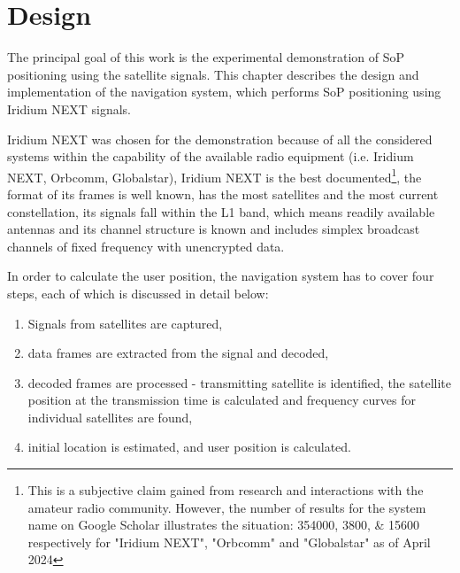 \chapter{Design}
\newcommand{\param}[1]{\texttt{\MakeUppercase{#1}}}
\newcommand{\variation}[1]{\paragraph{#1}}
\newcommand{\file}[1]{\paragraph{\texttt{#1}}}

The principal goal of this work is the experimental demonstration of SoP positioning using the satellite signals. This chapter describes the design and implementation of the navigation system, which performs SoP positioning using Iridium NEXT signals.

Iridium NEXT was chosen for the demonstration because of all the considered systems within the capability of the available radio equipment (i.e. Iridium NEXT, Orbcomm, Globalstar), Iridium NEXT is the best documented\footnote{This is a subjective claim gained from research and interactions with the amateur radio community. However, the number of results for the system name on Google Scholar illustrates the situation: \numlist{354000; 3800; 15600} respectively for "Iridium NEXT", "Orbcomm" and "Globalstar" as of April 2024}, the format of its frames is well known, has the most satellites and the most current constellation, its signals fall within the L1 band, which means readily available antennas and its channel structure is known and includes simplex broadcast channels of fixed frequency with unencrypted data.

In order to calculate the user position, the navigation system has to cover four steps, each of which is discussed in detail below:
\begin{enumerate}
    \item Signals from satellites are captured,
    \item data frames are extracted from the signal and decoded,
    \item decoded frames are processed - transmitting satellite is identified, the satellite position at the transmission time is calculated and frequency curves for individual satellites are found,
    \item initial location is estimated, and user position is calculated. 
\end{enumerate}

